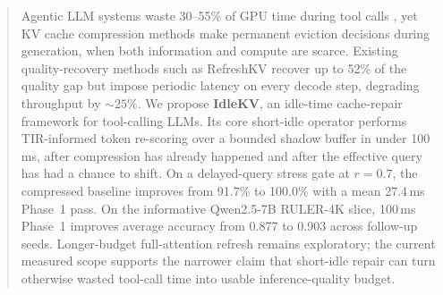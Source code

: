 \documentclass[10pt,twocolumn,letterpaper]{article}
\begin{document}


\begin{icmlauthorlist}
\end{icmlauthorlist}



\maketitle

%
\begin{abstract}
Agentic LLM systems waste 30--55\% of GPU time during tool calls
\citep{continuum2025,infercept2025}, yet KV cache compression methods make
permanent eviction decisions during generation, when both information and
compute are scarce.
Existing quality-recovery methods such as RefreshKV \citep{refreshkv2025}
recover up to 52\% of the quality gap but impose periodic latency on every
decode step, degrading throughput by ${\sim}25\%$.
We propose \textbf{IdleKV}, an idle-time cache-repair framework for
tool-calling LLMs.
Its core short-idle operator performs TIR-informed token re-scoring over a
bounded shadow buffer in under 100\,ms, after compression has already happened
and after the effective query has had a chance to shift.
On a delayed-query stress gate at $r{=}0.7$, the compressed baseline improves
from 91.7\% to 100.0\% with a mean 27.4\,ms Phase~1 pass.
On the informative Qwen2.5-7B RULER-4K slice, 100\,ms Phase~1 improves average
accuracy from 0.877 to 0.903 across follow-up seeds.
Longer-budget full-attention refresh remains exploratory; the current measured
scope supports the narrower claim that short-idle repair can turn otherwise
wasted tool-call time into usable inference-quality budget.
\end{abstract}
\end{document}
